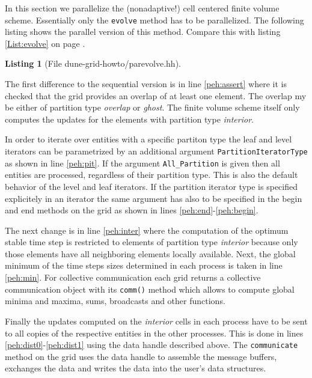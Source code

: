 \documentclass[11pt,a4paper,headinclude,footinclude,DIV16,normalheadings]{scrreprt}
\newtheorem{lst}{Listing}
\begin{document}
In this section we parallelize the (nonadaptive!) cell centered finite volume
scheme. Essentially only the \lstinline!evolve! method has to be
parallelized. The following listing shows the parallel version of this
method. Compare this with listing \ref{List:evolve} on page \pageref{List:evolve}.

\begin{lst}[File dune-grid-howto/parevolve.hh] \mbox{}
\nopagebreak

\end{lst}

The first difference to the sequential version is in line
\ref{peh:assert} where it is checked that the grid provides an overlap
of at least one element. The overlap my be either of partition type
\textit{overlap} or \textit{ghost}. The finite volume scheme itself
only computes the updates for the elements with partition type
\textit{interior}.

In order to iterate over entities with a specific partiton type the
leaf and level iterators can be parametrized by an additional argument
\lstinline!PartitionIteratorType! as shown in line \ref{peh:pit}. If
the argument \lstinline!All_Partition! is given then all entities are
processed, regardless of their partition type. This is also the
default behavior of the level and leaf iterators. If the partition
iterator type is specified explicitely in an iterator the same
argument has also to be specified in the begin and end methods on the
grid as shown in lines \ref{peh:end}-\ref{peh:begin}.

The next change is in line \ref{peh:inter} where the computation of
the optimum stable time step is restricted to elements of partition
type \textit{interior} because only those elements have all neighboring
elements locally available. Next, the global minimum of the time steps
sizes determined in each process is taken in line \ref{peh:min}. For
collective communication each grid returns a collective communication
object with its \lstinline!comm()! method which allows to compute
global minima and maxima, sums, broadcasts and other functions.

Finally the updates computed on the \textit{interior} cells in each
process have to be sent to all copies of the respective entities in
the other processes. This is done in lines
\ref{peh:dist0}-\ref{peh:dist1} using the data handle described above.
The \lstinline!communicate! method on the grid uses the data handle to
assemble the message buffers, exchanges the data and writes the data
into the user's data structures.
\end{document}
